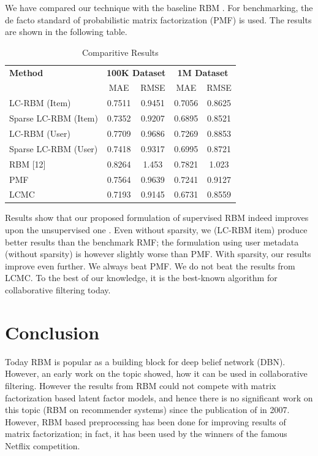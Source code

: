 \documentclass[conference]{IEEEtran}
\begin{document}
We have compared our technique with the baseline RBM \cite{Salakhutdinov}. For benchmarking, the de facto standard of probabilistic matrix factorization (PMF) \cite{Salakhutdinov2,Shan2,Ma} is used. The results are shown in the following table.


\renewcommand{\tabcolsep}{0.2cm}
    \begin{table}[!t]
        \centering
        \begin{tabular}{l  c  c  c  c}
            \toprule[0.2mm]
            \textbf{Method} & \multicolumn{2}{c}{\textbf{100K Dataset}} & \multicolumn{2}{c}{\textbf{1M Dataset}} \\
             & MAE & RMSE & MAE & RMSE \\
            \midrule
            LC-RBM (Item) & 0.7511 & 0.9451 & 0.7056 & 0.8625 \\
            Sparse LC-RBM (Item) & 0.7352 & 0.9207 & 0.6895 & 0.8521 \\
            LC-RBM (User) & 0.7709 & 0.9686 & 0.7269 & 0.8853 \\
            Sparse LC-RBM (User) & 0.7418 & 0.9317 & 0.6995 & 0.8721 \\
            RBM [12] & 0.8264 & 1.453 & 0.7821 & 1.023 \\
            PMF & 0.7564 & 0.9639 & 0.7241 & 0.9127 \\
            LCMC & 0.7193 & 0.9145 & 0.6731 & 0.8559 \\
            \bottomrule[0.2mm]
        \end{tabular}
        \caption{Comparitive Results}
        \label{table:1}
    \end{table}

Results show that our proposed formulation of supervised RBM indeed improves upon the unsupervised one \cite{Salakhutdinov}. Even without sparsity, we (LC-RBM item) produce better results than the benchmark RMF; the formulation using user metadata (without sparsity) is however slightly worse than PMF. With sparsity, our results improve even further. We always beat PMF. We do not beat the results from LCMC. To the best of our knowledge, it is the best-known algorithm for collaborative filtering today.
   
\section{Conclusion} 

Today RBM is popular as a building block for deep belief network (DBN). However, an early work on the topic showed, how it can be used in collaborative filtering. However the results from RBM could not compete with matrix factorization based latent factor models, and hence there is no significant work on this topic (RBM on recommender systems) since the publication of \cite{Salakhutdinov} in 2007. However, RBM based preprocessing has been done for improving results of matrix factorization; in fact, it has been used by the winners of the famous Netflix competition.
\end{document}
